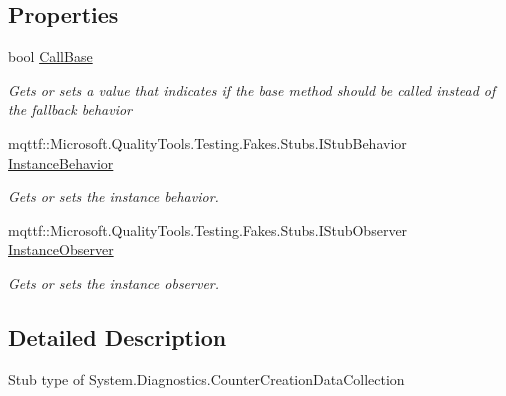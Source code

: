 \subsection*{Properties}
\begin{DoxyCompactItemize}
\item 
bool \hyperlink{class_system_1_1_diagnostics_1_1_fakes_1_1_stub_counter_creation_data_collection_a03d65951da82d1b79bd5939ec7036ca3}{Call\-Base}
\begin{DoxyCompactList}\small\item\em Gets or sets a value that indicates if the base method should be called instead of the fallback behavior\end{DoxyCompactList}\item 
mqttf\-::\-Microsoft.\-Quality\-Tools.\-Testing.\-Fakes.\-Stubs.\-I\-Stub\-Behavior \hyperlink{class_system_1_1_diagnostics_1_1_fakes_1_1_stub_counter_creation_data_collection_a67d7d4c84306504f2bc29efebf17c3e1}{Instance\-Behavior}
\begin{DoxyCompactList}\small\item\em Gets or sets the instance behavior.\end{DoxyCompactList}\item 
mqttf\-::\-Microsoft.\-Quality\-Tools.\-Testing.\-Fakes.\-Stubs.\-I\-Stub\-Observer \hyperlink{class_system_1_1_diagnostics_1_1_fakes_1_1_stub_counter_creation_data_collection_ad8cc7d27512b90eed57599b2dfde665e}{Instance\-Observer}
\begin{DoxyCompactList}\small\item\em Gets or sets the instance observer.\end{DoxyCompactList}\end{DoxyCompactItemize}


\subsection{Detailed Description}
Stub type of System.\-Diagnostics.\-Counter\-Creation\-Data\-Collection



